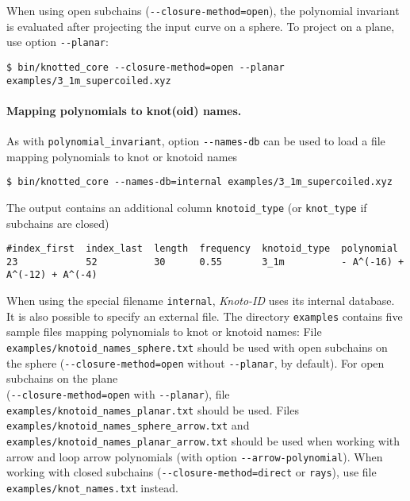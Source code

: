 When using open subchains (\lstinline{--closure-method=open}), the polynomial invariant is evaluated after projecting the input curve on a sphere. To project on a plane, use option \lstinline{--planar}:
\begin{lstlisting}
$ bin/knotted_core --closure-method=open --planar examples/3_1m_supercoiled.xyz
\end{lstlisting}


\paragraph{Mapping polynomials to knot(oid) names.}
As with \lstinline{polynomial_invariant}, option \lstinline{--names-db} can be used to load a file mapping polynomials to knot or knotoid names
\begin{lstlisting}
$ bin/knotted_core --names-db=internal examples/3_1m_supercoiled.xyz
\end{lstlisting}
The output contains an additional column \lstinline{knotoid_type} (or \lstinline{knot_type} if subchains are closed)
\begin{lstlisting}
#index_first  index_last  length  frequency  knotoid_type  polynomial
23            52          30      0.55       3_1m          - A^(-16) + A^(-12) + A^(-4)
\end{lstlisting}
When using the special filename \lstinline{internal}, {\it Knoto-ID} uses its internal database. It is also possible to specify an external file. The directory \lstinline{examples} contains five sample files mapping polynomials to knot or knotoid names:  File \lstinline{examples/knotoid_names_sphere.txt} should be used with open subchains on the sphere 
(\lstinline{--closure-method=open} without \lstinline{--planar}, by default). For open subchains on the plane\\
(\lstinline{--closure-method=open} with \lstinline{--planar}), file \lstinline{examples/knotoid_names_planar.txt} should be used. Files  \lstinline{examples/knotoid_names_sphere_arrow.txt} and  \lstinline{examples/knotoid_names_planar_arrow.txt} should be used when working with arrow and loop arrow polynomials (with option \lstinline{--arrow-polynomial}).
When working with closed subchains (\lstinline{--closure-method=direct} or \lstinline{rays}), use file \lstinline{examples/knot_names.txt} instead.

